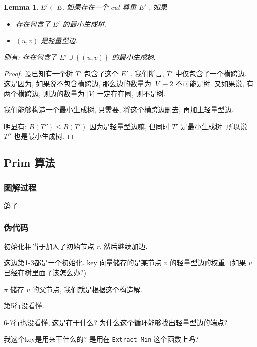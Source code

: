 \documentclass[a4paper, 10pt]{ctexart} %
\newtheorem{lemma}{Lemma}
\begin{document}
\begin{lemma}
    $E' \subset E$, 如果存在一个 cut 尊重 $E'$ , 如果
    \begin{itemize}\setlength\itemsep{-0.2em}
        \item[1.] 存在包含了 $E'$ 的最小生成树. 
        \item[2.] $\left(u ,v\right)$ 是轻量型边. 
    \end{itemize}
    则有: 存在包含了 $E' \cup \left\{ \left( u,v\right)\right\}$ 的最小生成树. 
\end{lemma}
\begin{proof}
    设已知有一个树 $T'$ 包含了这个 $E'$ . 我们断言, $T'$ 中仅包含了一个横跨边. 
这是因为, 如果说不包含横跨边, 那么边的数量为 $\left| V \right|  - 2$ 不可能是树. 又如果说, 有两个横跨边, 
则边的数量为 $\left| V \right|  $ 一定存在圈, 则不是树.

我们能够构造一个最小生成树, 只需要, 将这个横跨边删去, 再加上轻量型边. 

明显有: $B \left(T''\right) \le B \left(T'\right)$ 因为是轻量型边嘛, 但同时 $T'$ 是最小生成树.
所以说 $T''$ 也是最小生成树.
\end{proof}
\subsection{Prim 算法}
\subsubsection{图解过程}
鸽了
\subsubsection{伪代码}
初始化相当于加入了初始节点 $r$, 然后继续加边. 

这边第1-3都是一个初始化. 
key 向量储存的是某节点 $v$ 的轻量型边的权重. (如果 $v$ 已经在树里面了该怎么办?)

$\pi  $ 储存 $v$ 的父节点, 我们就是根据这个构造解. 

第5行没看懂.

6-7行也没看懂, 这是在干什么? 为什么这个循环能够找出轻量型边的端点? 

我这个key是用来干什么的? 是用在 \verb|Extract-Min| 这个函数上吗?
\end{document}
